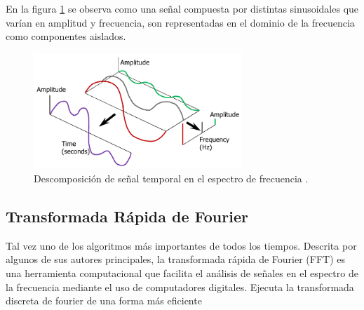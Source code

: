 En la figura \ref{fig:fourier} se observa como una señal compuesta por distintas sinusoidales que varían en amplitud y frecuencia, son representadas en el dominio de la frecuencia como componentes aislados. 

\begin{figure}[H]
    \centering
    \includegraphics[width = 0.7\textwidth]{imagenes/cap1_marcoteo/FourierTRansform.png}
    \caption{Descomposición de señal temporal en el espectro de frecuencia \citep{siemens2019}.}
    \label{fig:fourier}
\end{figure}





\subsection{Transformada Rápida de Fourier} Tal vez uno de los algoritmos más importantes de todos los tiempos. Descrita por algunos de sus autores principales, la transformada rápida de Fourier  (FFT) es una herramienta computacional que facilita el análisis de señales en el espectro de la frecuencia mediante el uso de computadores digitales. Ejecuta la transformada discreta de fourier de una forma más eficiente 

